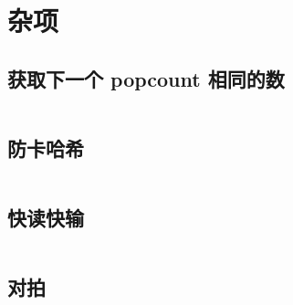 \section{杂项}

\subsection{获取下一个 popcount 相同的数}

\inputminted{cpp}{icpc/misc/next_hamming/next_hamming.cpp}

\subsection{防卡哈希}

\inputminted{cpp}{icpc/misc/hash/hash.cpp}

\subsection{快读快输}

\inputminted{cpp}{icpc/misc/fastio/fastio.cpp}

\subsection{对拍}

\inputminted{cpp}{icpc/misc/fastio/fastio.cpp}